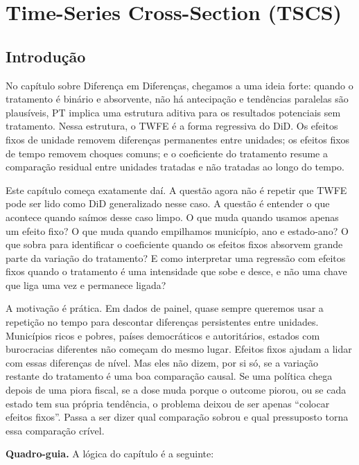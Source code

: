 \documentclass[
]{article}
\begin{document}
\section{Time-Series Cross-Section (TSCS)}\label{time-series-cross-section-tscs}

\subsection{Introdução}\label{introduuxe7uxe3o-6}

No capítulo sobre Diferença em Diferenças, chegamos a uma ideia forte: quando o tratamento é binário e absorvente, não há antecipação e tendências paralelas são plausíveis, PT implica uma estrutura aditiva para os resultados potenciais sem tratamento. Nessa estrutura, o TWFE é a forma regressiva do DiD. Os efeitos fixos de unidade removem diferenças permanentes entre unidades; os efeitos fixos de tempo removem choques comuns; e o coeficiente do tratamento resume a comparação residual entre unidades tratadas e não tratadas ao longo do tempo.

Este capítulo começa exatamente daí. A questão agora não é repetir que TWFE pode ser lido como DiD generalizado nesse caso. A questão é entender o que acontece quando saímos desse caso limpo. O que muda quando usamos apenas um efeito fixo? O que muda quando empilhamos município, ano e estado-ano? O que sobra para identificar o coeficiente quando os efeitos fixos absorvem grande parte da variação do tratamento? E como interpretar uma regressão com efeitos fixos quando o tratamento é uma intensidade que sobe e desce, e não uma chave que liga uma vez e permanece ligada?

A motivação é prática. Em dados de painel, quase sempre queremos usar a repetição no tempo para descontar diferenças persistentes entre unidades. Municípios ricos e pobres, países democráticos e autoritários, estados com burocracias diferentes não começam do mesmo lugar. Efeitos fixos ajudam a lidar com essas diferenças de nível. Mas eles não dizem, por si só, se a variação restante do tratamento é uma boa comparação causal. Se uma política chega depois de uma piora fiscal, se a dose muda porque o outcome piorou, ou se cada estado tem sua própria tendência, o problema deixou de ser apenas ``colocar efeitos fixos''. Passa a ser dizer qual comparação sobrou e qual pressuposto torna essa comparação crível.

\textbf{Quadro-guia.} A lógica do capítulo é a seguinte:
\end{document}
